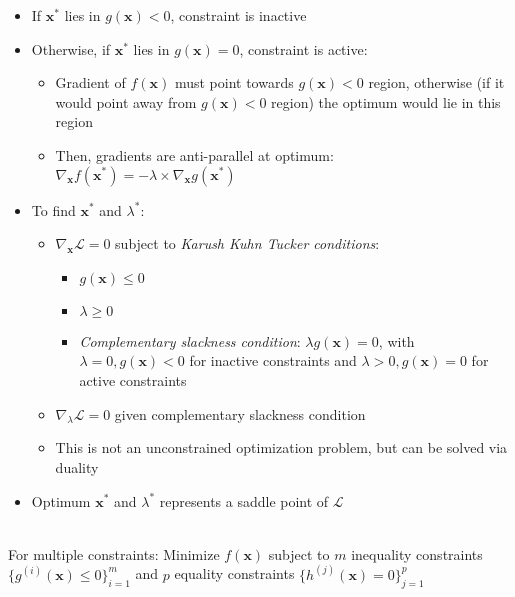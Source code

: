 \begin{itemize}
    \item If $\boldsymbol{x^*}$ lies in $g(\boldsymbol{x}) < 0$, constraint is inactive
    \item Otherwise, if $\boldsymbol{x^*}$ lies in $g(\boldsymbol{x}) = 0$, constraint is active:
    \begin{itemize}
        \item Gradient of $f(\boldsymbol{x})$ must point towards $g(\boldsymbol{x}) < 0$ region, otherwise (if it would point away from $g(\boldsymbol{x}) < 0$ region) the optimum would lie in this region
        \item Then, gradients are anti-parallel at optimum: $\nabla_{\boldsymbol{x}} f(\boldsymbol{x^*}) = -\lambda \times \nabla_{\boldsymbol{x}} g(\boldsymbol{x^*})$
    \end{itemize}
    \item To find $\boldsymbol{x^*}$ and $\lambda^*$: 
    \begin{itemize}
        \item $\nabla_{\boldsymbol{x}} \mathcal{L} = 0$ subject to \emph{Karush Kuhn Tucker conditions}:
        \begin{itemize}
            \item $g(\boldsymbol{x}) \leq 0$
            \item $\lambda \geq 0$
            \item \emph{Complementary slackness condition}: $\lambda g(\boldsymbol{x}) = 0$, with $\lambda = 0, g(\boldsymbol{x}) < 0$ for inactive constraints and $\lambda > 0, g(\boldsymbol{x}) = 0$ for active constraints
        \end{itemize}
        \item $\nabla_{\lambda} \mathcal{L} = 0$ given complementary slackness condition
        \item This is not an unconstrained optimization problem, but can be solved via duality
    \end{itemize}
    \item Optimum $\boldsymbol{x^*}$ and $\lambda^*$ represents a saddle point of $\mathcal{L}$
\end{itemize}\\
For multiple constraints: Minimize $f(\boldsymbol{x})$ subject to $m$ inequality constraints $\{g^{(i)}(\boldsymbol{x}) \leq 0\}_{i=1}^m$ and $p$ equality constraints $\{h^{(j)}(\boldsymbol{x}) = 0\}_{j=1}^p$ 
